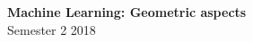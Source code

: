 \documentclass[11pt]{article}
\begin{document}
	\begin{center}
		\Large\textbf{Machine Learning: Geometric aspects}\\
		Semester 2 2018
	\end{center}
\end{document}
